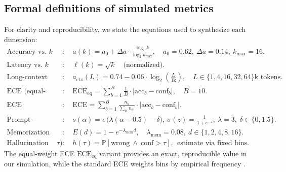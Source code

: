 \documentclass[10pt]{article}
\begin{document}
\subsection{Formal definitions of simulated metrics}
For clarity and reproducibility, we state the equations used to synthesize each dimension:
\begin{align}
\text{Accuracy vs.\ }k &: \quad a(k) = a_0 + \Delta a \cdot \frac{\log_2 k}{\log_2 k_{\max}}, \quad a_0{=}0.62,~\Delta a{=}0.14,~k_{\max}{=}16. \\
\text{Latency vs.\ }k &: \quad \ell(k) = \sqrt{k} \quad \text{(normalized)}. \\
\text{Long-context accuracy} &: \quad a_{\text{ctx}}(L) = 0.74 - 0.06 \cdot \log_2 \left(\frac{L}{1\text{k}}\right), \quad L \in \{1,4,16,32,64\}\text{k tokens}. \\
\text{ECE (equal-width bins)} &: \quad \mathrm{ECE}_{\mathrm{eq}} = \sum_{b=1}^{B} \tfrac{1}{B} \cdot \left| \mathrm{acc}_b - \mathrm{conf}_b \right|, \quad B{=}10. \\
\text{ECE (standard)} &: \quad \mathrm{ECE} = \sum_{b=1}^{B} \frac{n_b}{\sum_{b'} n_{b'}} \cdot \left| \mathrm{acc}_b - \mathrm{conf}_b \right|. \\
\text{Prompt-injection success} &: \quad s(\alpha) = \sigma\big(\lambda(\alpha - 0.5) - \delta\big),\ \sigma(z)=\tfrac{1}{1+e^{-z}},\ \lambda{=}3,\ \delta\in\{0,1.5\}. \\
\text{Memorization exposure} &: \quad E(d) = 1 - e^{-\lambda_{\mathrm{mem}} d}, \quad \lambda_{\mathrm{mem}}{=}0.08,~d \in \{1,2,4,8,16\}. \\
\text{Hallucination (at threshold $\tau$)} &: \quad h(\tau)=\mathbb{P}[\text{wrong}\ \wedge\ \mathrm{conf}>\tau],\ \ \text{estimate via fixed bins.}
\end{align}
The equal-weight ECE $\mathrm{ECE}_{\mathrm{eq}}$ variant provides an exact, reproducible value in our simulation, while the standard ECE weights bins by empirical frequency \citep{Guo2017Calibration}.
\end{document}
